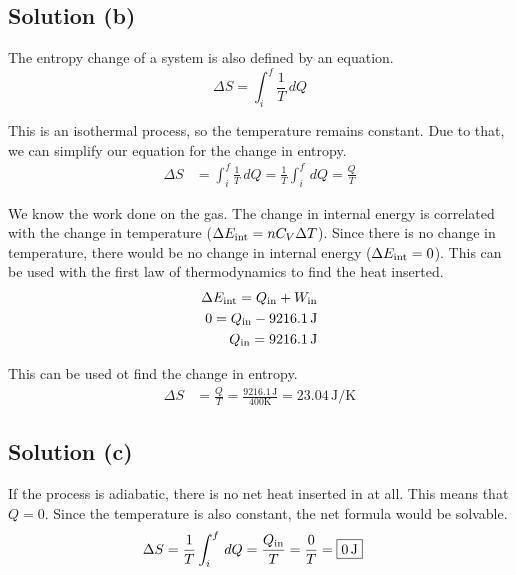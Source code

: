 \documentclass[12pt]{article}
\begin{document}
        \subsection{Solution (b)}
            The entropy change of a system is also defined by an equation.
            \begin{equation}
                \Delta S    =   \int_{i}^{f} \frac{1}{T}\,dQ
            \end{equation}

            This is an isothermal process, so the temperature remains constant. 
            Due to that, we can simplify our equation for the change in entropy.
            \begin{align}
                \Delta S    &=  \int_{i}^{f} \frac{1}{T}\,dQ
                    =   \frac{1}{T}\int_{i}^{f} \,dQ
                    =   \frac{Q}{T}
            \end{align}

            We know the work done on the gas.
            The change in internal energy is correlated with the change in temperature ($\Delta E_{\rm int} = nC_V \Delta T$).
            Since there is no change in temperature, there would be no change in internal energy ($\Delta E_{\rm int} = 0$).
            This can be used with the first law of thermodynamics to find the heat inserted.
            \begin{eqnarray}
                \Delta E_{\rm int}  =   Q_{\rm in} + W_{\rm in}\\
                0   =   Q_{\rm in}  -   9216.1\,\unit{\joule}\\
                Q_{\rm in}  =   9216.1\,\unit{\joule}
            \end{eqnarray}

            This can be used ot find the change in entropy.
            \begin{align}
                \Delta S    &=  \frac{Q}{T}
                    =   \frac{9216.1\,\unit{\joule}}{400\unit{\kelvin}}
                    =   \boxed{23.04\,\unit{\joule/\kelvin}}
            \end{align}

        \subsection{Solution (c)}
            If the process is adiabatic, there is no net heat inserted in at all.
            This means that $Q = 0$. 
            Since the temperature is also constant, the net formula would be solvable.
            \begin{align}
                \Delta S    &=  \frac{1}{T} \int_{i}^{f}\,dQ
                    =   \frac{Q_{\rm in}}{T}
                    =   \frac{0}{T}
                    =   \boxed{0\,\unit{\joule}}
            \end{align}
\end{document}
